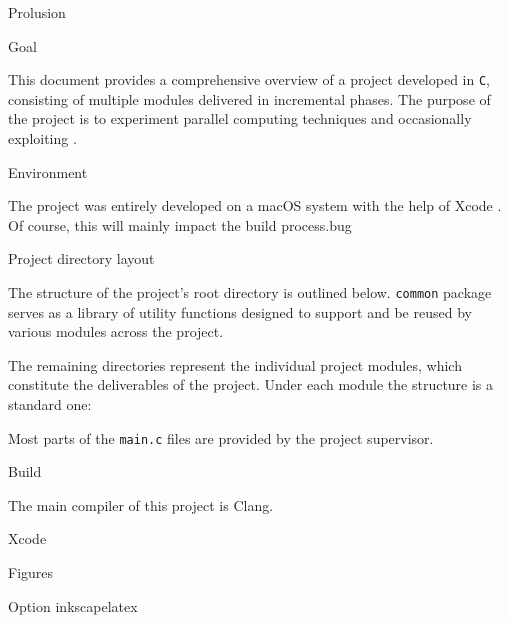 \begin{chapter}{Prolusion}
	\begin{section}{Goal}
		\par This document provides a comprehensive overview of a project developed in \texttt{C}, consisting of multiple modules delivered in incremental phases. The purpose of the project is to experiment parallel computing techniques and occasionally exploiting .
	\end{section}
	\begin{section}{Environment}
		\par The project was entirely developed on a macOS system with the help of Xcode . Of course, this will mainly impact the build process.\gls{bug}
	\end{section}
	\begin{section}{Project directory layout}
		\par The structure of the project’s root directory is outlined below.
		\medskip
		\medskip
		\texttt{common} package serves as a library of utility functions designed to support and be reused by various modules across the project.
		\clearpage
		\par The remaining directories represent the individual project modules, which constitute the deliverables of the project. Under each module the structure is a standard one:
		\medskip
		\medskip
		\par Most parts of the \texttt{main.c} files are provided by the project supervisor.
	\end{section}
	\begin{section}{Build}
		\par The main compiler of this project is Clang.
		\par
		\begin{subsection}{Xcode}
			\par
		\end{subsection}
	\end{section}
    \begin{section}{Figures}
    	\begin{subsection}{Option inkscapelatex}

\end{subsection}
\end{section}
\end{chapter}
